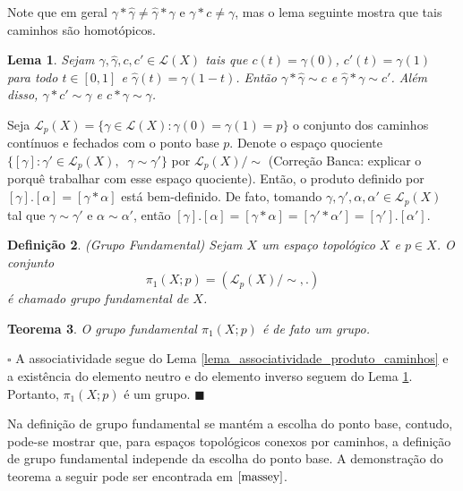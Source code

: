 \documentclass[12pt]{book}
\newtheorem{teorema}{Teorema}[section]
\newtheorem{lema}[teorema]{Lema}
\newtheorem{definicao}[teorema]{Definição}
\newenvironment{prova}[1]{$\square$ #1}{\hfill$\blacksquare$}
\newcommand{\caminhos}{\mathcal{L}}
\newcommand{\caminhospontobase}[1]{\caminhos_{#1}}
\newcommand{\caminhossempontobase}[1]{\caminhos(#1)}
\newcommand{\caminhospontobasegeral}[2]{\caminhos_{#1}(#2)}
\newcommand{\classe}[1]{[#1]}
\newcommand{\grupofundamentalpontobase}[2]{\pi_{1}(#1; #2)}
\newcommand{\intervalo}{[0,1]}
\newcommand{\alerta}[1]{{\color{red}#1}}
\newcommand{\correcaobanca}[1]{\alerta{(Correção Banca: #1)}}
\begin{document}
	Note que em geral $\gamma*\hat{\gamma}\neq \hat{\gamma}*\gamma$ e $\gamma*c\neq \gamma$, mas o lema seguinte mostra que tais caminhos são homotópicos.
	
	\begin{lema}\label{lema_caminho_inverso}
		Sejam $\gamma, \hat{\gamma} , c,c' \in \caminhossempontobase{X}$ tais que $c(t) = \gamma(0)$, $c'(t) = \gamma(1)$ para todo $t\in \intervalo$ e $\hat{\gamma} (t) = \gamma(1-t)$. Então $\gamma*\hat{\gamma}  \sim c$ e $\hat{\gamma}  *\gamma\sim c'$. Além disso, $\gamma * c' \sim\gamma$ e $c * \gamma \sim \gamma$.
	\end{lema} 	
	
	Seja $\caminhospontobasegeral{p}{X} = \{\gamma\in \caminhossempontobase{X}: \gamma(0)=\gamma(1)=p \}$ o conjunto dos caminhos contínuos e fechados com o ponto base $p$. Denote o espaço quociente $\{ \classe{\gamma} : \gamma' \in \caminhospontobasegeral{p}{X},\;\;\gamma \sim \gamma'\}$ por $\caminhospontobasegeral{p}{X}/\sim $ \correcaobanca{explicar o porquê trabalhar com esse espaço quociente}. Então, o produto definido por $\classe{\gamma}.\classe{\alpha} = \classe{\gamma*\alpha}$ está bem-definido. De fato, tomando $\gamma, \gamma',\alpha, \alpha' \in \caminhospontobasegeral{p}{X}$ tal que $\gamma \sim \gamma'$ e $\alpha \sim \alpha'$, então $\classe{\gamma}.\classe{\alpha} = \classe{\gamma*\alpha} = \classe{\gamma'*\alpha'} = \classe{\gamma'}.\classe{\alpha'}$.
	
	
	\begin{definicao}
		(Grupo Fundamental) Sejam $X$ um espaço topológico $X$ e $p\in X$. O conjunto
		$$
		\grupofundamentalpontobase{X}{p} = (\caminhospontobase{p}(X)/\sim, .)
		$$
		é chamado grupo fundamental de $X$.
	\end{definicao}
	
	\begin{teorema}
		O grupo fundamental $\grupofundamentalpontobase{X}{p}$ é de fato um grupo.
	\end{teorema}
	\begin{prova}
	A associatividade segue do Lema \ref{lema_associatividade_produto_caminhos} e a existência do elemento neutro e do elemento inverso  seguem do Lema \ref{lema_caminho_inverso}. Portanto, $\grupofundamentalpontobase{X}{p}$ é um grupo. 
	\end{prova}
	
	Na definição de grupo fundamental se mantém a escolha do ponto base, contudo, pode-se mostrar que, para espaços topológicos conexos por caminhos, a definição de grupo fundamental independe da escolha do ponto base. A demonstração do teorema a seguir pode ser encontrada em $\cite{massey}$.
	
\end{document}
